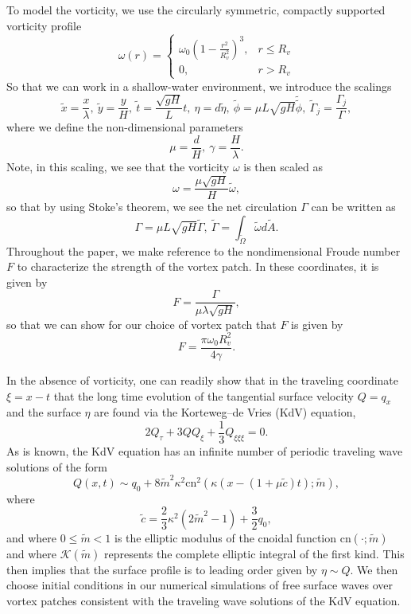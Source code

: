 \documentclass[a4paper,11pt]{article}
\newcommand{\ba}{\begin{array}}
\newcommand{\ea}{\end{array}}
\begin{document}
To model the vorticity, we use the circularly symmetric, compactly supported vorticity profile
\[
\omega(r) =\left\{  \ba{rl}  \omega_{0}\left(1-\frac{r^{2}}{R_{v}^{2}}\right)^{3}, & r\leq R_{v} \\ 0, & r>R_{v} \ea\right.
\] 
So that we can work in a shallow-water environment, we introduce the scalings 
\[
\tilde{x} = \frac{x}{\lambda}, ~\tilde{y} = \frac{y}{H}, ~ \tilde{t} = \frac{\sqrt{gH}}{L} t, ~ \eta = d\tilde{\eta}, ~ \tilde{\phi} = \mu L\sqrt{gH} \tilde{\tilde{\phi}}, ~ \tilde{\Gamma}_{j} = \frac{\Gamma_{j}}{\Gamma},
\]
where we define the non-dimensional parameters
\[
\mu= \frac{d}{H}, ~ \gamma = \frac{H}{\lambda}.  
\]
Note, in this scaling, we see that the vorticity $\omega$ is then scaled as 
\[
\omega = \frac{\mu \sqrt{gH}}{H}\tilde{\omega},
\]
so that by using Stoke's theorem, we see the net circulation $\Gamma$ can be written as 
\[
\Gamma = \mu L \sqrt{gH} \tilde{\Gamma}, ~ \tilde{\Gamma} = \int_{ \tilde{\Omega} } \tilde{\omega} d\tilde{A}.
\]
Throughout the paper, we make reference to the nondimensional Froude number $F$ to characterize the strength of the vortex patch.  In these coordinates, it is given by 
\[
F = \frac{\Gamma}{\mu \lambda \sqrt{gH}}, 
\]
so that we can show for our choice of vortex patch that $F$ is given by 
\[
F = \frac{\pi \omega_{0}R_{v}^{2}}{4\gamma}.
\]

In the absence of vorticity, one can readily show that in the traveling coordinate $\xi = x-t$ that the long time evolution of the tangential surface velocity $Q = q_{x}$ and the surface $\eta$ are found via the Korteweg--de Vries (KdV) equation, 
\[
2Q_{\tau} + 3QQ_{\xi} + \frac{1}{3} Q_{\xi\xi\xi} = 0.
\]
As is known, the KdV equation has an infinite number of periodic traveling wave solutions of the form 
\begin{equation}
Q(x,t) \sim q_{0} + 8 \tilde{m}^{2}\kappa^{2}\mbox{cn}^{2}\left(\kappa \left( x- \left(1 + \mu \tilde{c}\right)t\right);\tilde{m}\right),
\label{kdvsolpot}
\end{equation}
where
\[
\tilde{c} = \frac{2}{3}\kappa^{2} (2\tilde{m}^{2}-1)+\frac{3}{2}q_{0},
\]
and where $0\leq \tilde{m}<1$ is the elliptic modulus of the cnoidal function $\mbox{cn}(\cdot;\tilde{m})$ and where $\mathcal{K}(\tilde{m})$ represents the complete elliptic integral of the first kind.  This then implies that the surface profile is to leading order given by $\eta \sim Q$.  We then choose initial conditions in our numerical simulations of free surface waves over vortex patches consistent with the traveling wave solutions of the KdV equation.
\end{document}
